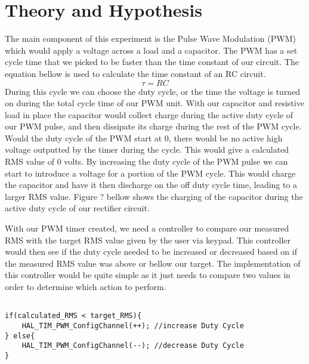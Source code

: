 \section{Theory and Hypothesis}
The main component of this experiment is the Pulse Wave Modulation (PWM) which would apply a voltage across a load and a capacitor. The PWM has a set cycle time that we picked to be faster than the time constant of our circuit. The equation bellow is used to calculate the time constant of an RC circuit. $$\tau = RC$$ During this cycle we can choose the duty cycle, or the time the voltage is turned on during the total cycle time of our PWM unit. With our capacitor and resistive load in place the capacitor would collect charge during the active duty cycle of our PWM pulse, and then dissipate its charge during the rest of the PWM cycle. 
Would the duty cycle of the PWM start at 0, there would be no active high voltage outputted by the timer during the cycle. This would give a calculated RMS value of 0 volts. By increasing the duty cycle of the PWM pulse we can start to introduce a voltage for a portion of the PWM cycle. This would charge the capacitor and have it then discharge on the off duty cycle time, leading to a larger RMS value. Figure ? bellow shows the charging of the capacitor during the active duty cycle of our rectifier circuit. 


With our PWM timer created, we need a controller to compare our measured RMS with the target RMS value given by the user via keypad. This controller would then see if the duty cycle needed to be increased or decreased based on if the measured RMS value was above or bellow our target. The implementation of this controller would be quite simple as it just needs to compare two values in order to determine which action to perform.

\lstset{language=C}
\begin{lstlisting}

if(calculated_RMS < target_RMS){
	HAL_TIM_PWM_ConfigChannel(++); //increase Duty Cycle
} else{
	HAL_TIM_PWM_ConfigChannel(--); //decrease Duty Cycle
}
\end{lstlisting}


